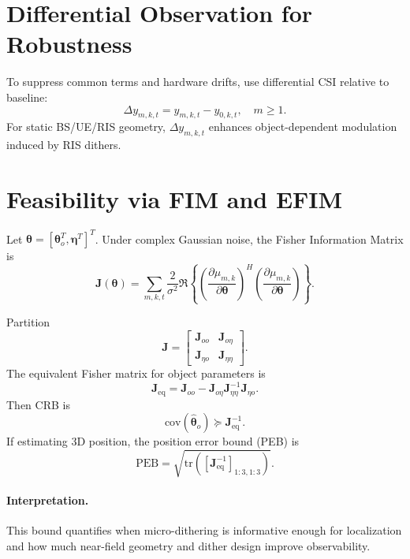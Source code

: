 \documentclass[11pt,a4paper]{article}
\newcommand{\tr}{\mathrm{tr}}
\begin{document}
\section{Differential Observation for Robustness}
To suppress common terms and hardware drifts, use differential CSI relative to baseline:
\begin{equation}
\Delta y_{m,k,t}=y_{m,k,t}-y_{0,k,t},\quad m\ge 1.
\end{equation}
For static BS/UE/RIS geometry, $\Delta y_{m,k,t}$ enhances object-dependent modulation induced by RIS dithers.

\section{Feasibility via FIM and EFIM}
Let $\bm{\theta}=[\bm{\theta}_o^T,\bm{\eta}^T]^T$. Under complex Gaussian noise, the Fisher Information Matrix is
\begin{equation}
\mathbf{J}(\bm{\theta})=
\sum_{m,k,t}\frac{2}{\sigma^2}
\Re\!\left\{
\left(\frac{\partial \mu_{m,k}}{\partial \bm{\theta}}\right)^H
\left(\frac{\partial \mu_{m,k}}{\partial \bm{\theta}}\right)
\right\}.
\end{equation}

Partition
\begin{equation}
\mathbf{J}=
\begin{bmatrix}
\mathbf{J}_{oo} & \mathbf{J}_{o\eta}\\
\mathbf{J}_{\eta o} & \mathbf{J}_{\eta\eta}
\end{bmatrix}.
\end{equation}
The equivalent Fisher matrix for object parameters is
\begin{equation}
\mathbf{J}_{\mathrm{eq}}=\mathbf{J}_{oo}-\mathbf{J}_{o\eta}\mathbf{J}_{\eta\eta}^{-1}\mathbf{J}_{\eta o}.
\end{equation}
Then CRB is
\begin{equation}
\mathrm{cov}(\hat{\bm{\theta}}_o)\succeq \mathbf{J}_{\mathrm{eq}}^{-1}.
\end{equation}
If estimating 3D position, the position error bound (PEB) is
\begin{equation}
\mathrm{PEB}=\sqrt{\tr\!\left(\left[\mathbf{J}_{\mathrm{eq}}^{-1}\right]_{1:3,1:3}\right)}.
\end{equation}

\paragraph{Interpretation.}
This bound quantifies when micro-dithering is informative enough for localization and how much near-field geometry and dither design improve observability.
\end{document}
